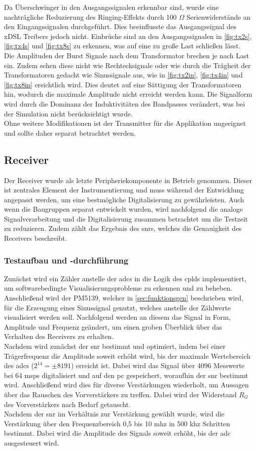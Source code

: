 Da Überschwinger in den Ausgangssignalen erkennbar sind, wurde eine nachträgliche Reduzierung des Ringing-Effekts durch 100 $\Omega$ Serienwiderstände an den Eingangssignalen durchgeführt. Dies beeinflusste das Ausgangssignal des xDSL Treibers jedoch nicht. Einbrüche sind an den Ausgangssignalen in \autoref{fig:tx2s}, \autoref{fig:tx4s} und \autoref{fig:tx8s} zu erkennen, was auf eine zu große Last schließen lässt. Die Amplituden der Burst Signale nach dem Transformator brechen je nach Last ein. Zudem sehen diese nicht wie Rechtecksignale oder wie durch die Trägheit der Transformatoren gedacht wie Sinussignale aus, wie in \autoref{fig:tx2in}, \autoref{fig:tx4in} und \autoref{fig:tx8in} ersichtlich wird. Dies deutet auf eine Sättigung der Transformatoren hin, wodurch die maximale Amplitude nicht erreicht werden kann. Die Signalform wird durch die Dominanz der Induktivitäten des Bandpasses verändert, was bei der Simulation nicht berücksichtigt wurde.\\
Ohne weitere Modifikationen ist der Transmitter für die Applikation ungeeignet und sollte daher separat betrachtet werden.
\subsection{Receiver}
Der Receiver wurde als letzte Peripheriekomponente in Betrieb genommen. Dieser ist zentrales Element der Instrumentierung und muss während der Entwicklung angepasst werden, um eine bestmögliche Digitalisierung zu gewährleisten. Auch wenn die Baugruppen separat entwickelt wurden, wird nachfolgend die analoge Signalverarbeitung und die Digitalisierung zusammen betrachtet um die Testzeit zu reduzieren. Zudem zählt das Ergebnis des \ac{snr}s, welches die Genauigkeit des Receivers beschreibt.
\subsubsection*{Testaufbau und -durchführung}
Zunächst wird ein Zähler anstelle der \ac{adc}s in die Logik des \ac{cpld}s implementiert, um softwarebedingte Visualisierungsprobleme zu erkennen und zu beheben. Anschließend wird der PM5139, welcher in \autoref{sec:funktionsgen} beschrieben wird, für die Erzeugung eines Sinussignal genutzt, welches anstelle der Zählwerte visualisiert werden soll. Nachfolgend werden an diesem das Signal in Form, Amplitude und Frequenz geändert, um einen groben Überblick über das Verhalten des Receivers zu erhalten.\\
Nachdem wird zunächst der \ac{snr} bestimmt und optimiert, indem bei einer Trägerfrequenz die Amplitude soweit erhöht wird, bis der maximale Wertebereich des \ac{adc}s ($2^{14}=\pm 8191$) erreicht ist. Dabei wird das Signal über 4096 Messwerte bei 64 \ac{msps} digitalisiert und auf den \ac{pc} gespeichert, woraufhin der \ac{snr} bestimmt wird. Anschließend wird dies für diverse Verstärkungen wiederholt, um Aussagen über das Rauschen des Vorverstärkers zu treffen. Dabei wird der Widerstand $R_G$ des Vorverstärkers nach Bedarf getauscht.\\
Nachdem der \ac{snr} im Verhältnis zur Verstärkung gewählt wurde, wird die Verstärkung über den Frequenzbereich 0,5 bis 10 \ac{mhz} in 500 \ac{khz} Schritten bestimmt. Dabei wird die Amplitude des Signals soweit erhöht, bis der \ac{adc} ausgesteuert wird.
